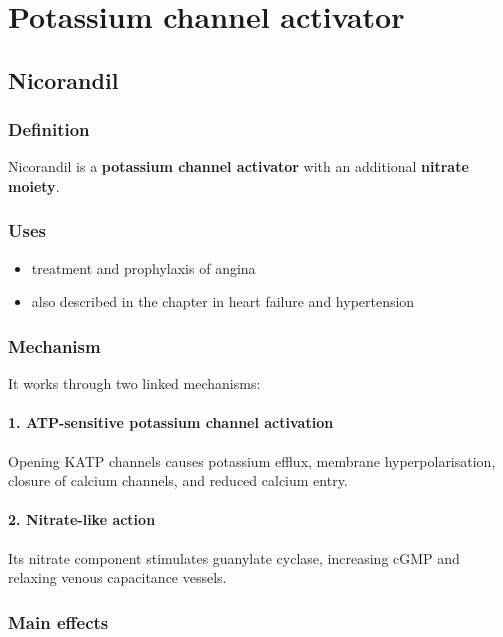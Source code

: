 \documentclass[11pt,a4paper]{article}
\begin{document}
\section{Potassium channel activator}

\subsection{Nicorandil}

\subsubsection*{Definition}

Nicorandil is a \textbf{potassium channel activator} with an additional \textbf{nitrate moiety}.

\subsubsection*{Uses}
\begin{itemize}
    \item treatment and prophylaxis of angina
    \item also described in the chapter in heart failure and hypertension
\end{itemize}

\subsubsection*{Mechanism}

It works through two linked mechanisms:

\paragraph{1. ATP-sensitive potassium channel activation}
Opening KATP channels causes potassium efflux, membrane hyperpolarisation, closure of calcium channels, and reduced calcium entry.

\paragraph{2. Nitrate-like action}
Its nitrate component stimulates guanylate cyclase, increasing cGMP and relaxing venous capacitance vessels.

\subsubsection*{Main effects}
\end{document}
